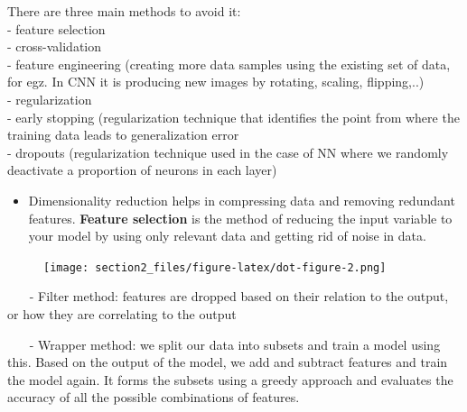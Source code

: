 \documentclass[
  letterpaper,
  DIV=11,
  numbers=noendperiod]{scrreprt}
\providecommand{\tightlist}{%
  \setlength{\itemsep}{0pt}\setlength{\parskip}{0pt}}\usepackage{longtable,booktabs,array}
\begin{document}
There are three main methods to avoid it:\\
\hspace*{0.333em}\hspace*{0.333em}- feature selection\\
\hspace*{0.333em}\hspace*{0.333em}- cross-validation\\
\hspace*{0.333em}\hspace*{0.333em}- feature engineering (creating more
data samples using the existing set of data, for egz. In CNN it is
producing new images by rotating, scaling, flipping,..)\\
\hspace*{0.333em}\hspace*{0.333em}- regularization\\
\hspace*{0.333em}\hspace*{0.333em}- early stopping (regularization
technique that identifies the point from where the training data leads
to generalization error\\
\hspace*{0.333em}\hspace*{0.333em}- dropouts (regularization technique
used in the case of NN where we randomly deactivate a proportion of
neurons in each layer)

\begin{itemize}
\tightlist
\item
  Dimensionality reduction helps in compressing data and removing
  redundant features. \textbf{Feature selection} is the method of
  reducing the input variable to your model by using only relevant data
  and getting rid of noise in data.
\end{itemize}

\hypertarget{feature-selection}{}
\begin{figure}[H]

{\centering \texttt{[image: section2\_files/figure-latex/dot-figure-2.png]}

}

\end{figure}

\hfill\break
\(~~~~~~~~\)- Filter method: features are dropped based on their
relation to the output, or how they are correlating to the output

\(~~~~~~~~\)- Wrapper method: we split our data into subsets and train a
model using this. Based on the output of the model, we add and subtract
features and train the model again. It forms the subsets using a greedy
approach and evaluates the accuracy of all the possible combinations of
features.
\end{document}
